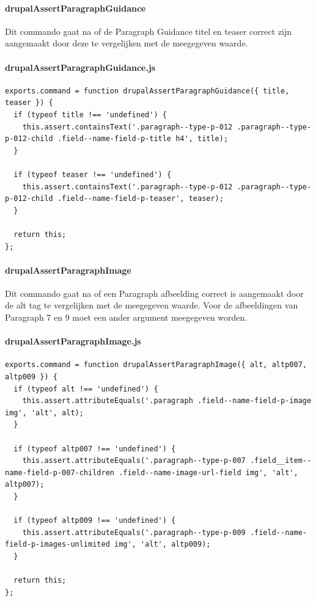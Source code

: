 \clearpage
\paragraph{drupalAssertParagraphGuidance}
\label{commando5}
Dit commando gaat na of de Paragraph Guidance titel en teaser correct zijn aangemaakt door deze te vergelijken met de meegegeven waarde.
\paragraph{drupalAssertParagraphGuidance.js}
\begin{lstlisting}[breaklines=true]
exports.command = function drupalAssertParagraphGuidance({ title, teaser }) {
  if (typeof title !== 'undefined') {
    this.assert.containsText('.paragraph--type-p-012 .paragraph--type-p-012-child .field--name-field-p-title h4', title);
  }

  if (typeof teaser !== 'undefined') {
    this.assert.containsText('.paragraph--type-p-012 .paragraph--type-p-012-child .field--name-field-p-teaser', teaser);
  }

  return this;
};
\end{lstlisting}


\clearpage
\paragraph{drupalAssertParagraphImage}
\label{commando6}
Dit commando gaat na of een Paragraph afbeelding correct is aangemaakt door de alt tag te vergelijken met de meegegeven waarde. Voor de afbeeldingen van Paragraph 7 en 9 moet een ander argument meegegeven worden.
\paragraph{drupalAssertParagraphImage.js}
\begin{lstlisting}[breaklines=true]
exports.command = function drupalAssertParagraphImage({ alt, altp007, altp009 }) {
  if (typeof alt !== 'undefined') {
    this.assert.attributeEquals('.paragraph .field--name-field-p-image img', 'alt', alt);
  }

  if (typeof altp007 !== 'undefined') {
    this.assert.attributeEquals('.paragraph--type-p-007 .field__item--name-field-p-007-children .field--name-image-url-field img', 'alt', altp007);
  }

  if (typeof altp009 !== 'undefined') {
    this.assert.attributeEquals('.paragraph--type-p-009 .field--name-field-p-images-unlimited img', 'alt', altp009);
  }

  return this;
};
\end{lstlisting}



